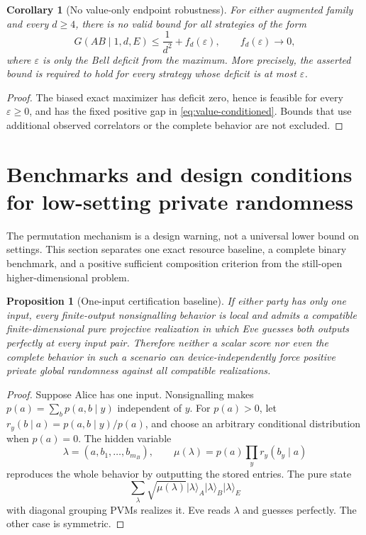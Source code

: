 \documentclass[11pt]{article}
\newtheorem{proposition}[theorem]{Proposition}
\newtheorem{corollary}[theorem]{Corollary}
\theoremstyle{definition}
\theoremstyle{remark}
\begin{document}
\begin{corollary}[No value-only endpoint robustness]
For either augmented family and every \(d\geq4\), there is no valid bound for
all strategies of the form
\[
 G(AB\mid1,d,E)\leq\frac1{d^2}+f_d(\varepsilon),
 \qquad f_d(\varepsilon)\longrightarrow0,
\]
where \(\varepsilon\) is only the Bell deficit from the maximum.
More precisely, the asserted bound is required to hold for every strategy
whose deficit is at most \(\varepsilon\).
\end{corollary}

\begin{proof}
The biased exact maximizer has deficit zero, hence is feasible for every
\(\varepsilon\geq0\), and
has the fixed positive gap in \eqref{eq:value-conditioned}.  Bounds that use
additional observed correlators or the complete behavior are not excluded.
\end{proof}

\section{Benchmarks and design conditions for low-setting private randomness}
\label{sec:settings}

The permutation mechanism is a design warning, not a universal lower bound
on settings.  This section separates one exact resource baseline, a complete
binary benchmark, and a positive sufficient composition criterion from the
still-open higher-dimensional problem.

\begin{proposition}[One-input certification baseline]
\label{prop:one-input}
If either party has only one input, every finite-output nonsignalling behavior
is local and admits a compatible finite-dimensional pure projective
realization in which Eve guesses both outputs perfectly at every input pair.
Therefore neither a scalar score nor even the complete behavior in such a
scenario can device-independently force positive private global randomness
against all compatible realizations.
\end{proposition}

\begin{proof}
Suppose Alice has one input.  Nonsignalling makes
\(p(a)=\sum_bp(a,b\mid y)\) independent of \(y\).  For \(p(a)>0\), let
\(r_y(b\mid a)=p(a,b\mid y)/p(a)\), and choose an arbitrary conditional
distribution when \(p(a)=0\).  The hidden variable
\[
 \lambda=(a,b_1,\ldots,b_{m_B}),
 \qquad
 \mu(\lambda)=p(a)\prod_yr_y(b_y\mid a)
\]
reproduces the whole behavior by outputting the stored entries.  The pure
state
\[
 \sum_\lambda\sqrt{\mu(\lambda)}
 \lvert\lambda\rangle_A\lvert\lambda\rangle_B
 \lvert\lambda\rangle_E
\]
with diagonal grouping PVMs realizes it.  Eve reads \(\lambda\) and guesses
perfectly.  The other case is symmetric.
\end{proof}
\end{document}
